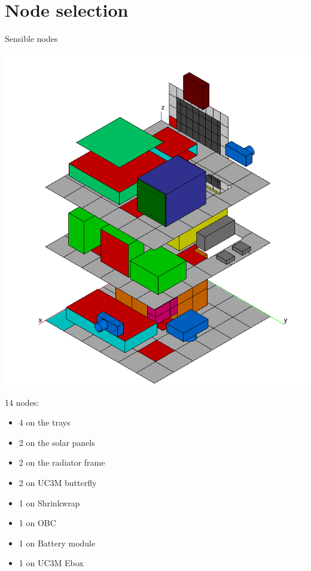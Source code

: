 \documentclass{cubeamer}
\begin{document}
\section{Node selection}
\begin{frame}{Sensible nodes}
\begin{center}

    \begin{minipage}{0.45\textwidth}
    \includegraphics[width=0.9\linewidth]{Figures/nodos1.png}
\end{minipage}
\begin{minipage}{0.5\textwidth}
14 nodes:
    \begin{itemize}
        \item 4 on the trays
        \item 2 on the solar panels
        \item 2 on the radiator frame
        \item 2 on UC3M butterfly 
        \item 1 on Shrinkwrap
        \item 1 on OBC
        \item 1 on Battery module
        \item 1 on UC3M Ebox
    \end{itemize}
\end{minipage}
\end{center}

\end{frame}
\end{document}
